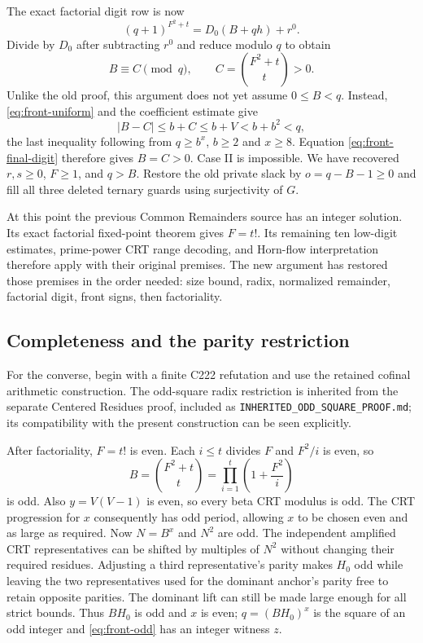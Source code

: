 The exact factorial digit row is now
\[
 (q+1)^{F^2+t}=D_0(B+qh)+r^0.
\]
Divide by $D_0$ after subtracting $r^0$ and reduce modulo $q$ to obtain
\begin{equation}
 B\equiv C\pmod q,
 \qquad C=\binom{F^2+t}{t}>0.
 \label{eq:front-final-digit}
\end{equation}
Unlike the old proof, this argument does not yet assume $0\leq B<q$.
Instead, \eqref{eq:front-uniform} and the coefficient estimate give
\[
 |B-C|\leq b+C\leq b+V<b+b^2<q,
\]
the last inequality following from $q\geq b^x$, $b\geq2$ and $x\geq8$.
Equation \eqref{eq:front-final-digit} therefore gives $B=C>0$.
Case II is impossible.  We have recovered $r,s\geq0$, $F\geq1$,
and $q>B$.  Restore the old private slack by $o=q-B-1\geq0$ and fill
all three deleted ternary guards using surjectivity of $G$.

At this point the previous Common Remainders source has an integer
solution.  Its exact factorial fixed-point theorem gives $F=t!$.
Its remaining ten low-digit estimates, prime-power CRT range decoding,
and Horn-flow interpretation therefore apply with their original
premises.  The new argument has restored those premises in the order
needed: size bound, radix, normalized remainder, factorial digit, front
signs, then factoriality.

\subsection{Completeness and the parity restriction}

For the converse, begin with a finite C222 refutation and use the
retained cofinal arithmetic construction.  The odd-square radix
restriction is inherited from the separate Centered Residues proof,
included as \texttt{INHERITED\_ODD\_SQUARE\_PROOF.md}; its compatibility
with the present construction can be seen explicitly.

After factoriality, $F=t!$ is even.  Each $i\leq t$ divides $F$ and
$F^2/i$ is even, so
\[
 B=\binom{F^2+t}{t}=\prod_{i=1}^t\left(1+\frac{F^2}{i}\right)
\]
is odd.  Also $y=V(V-1)$ is even, so every beta CRT modulus is odd.
The CRT progression for $x$ consequently has odd period, allowing $x$
to be chosen even and as large as required.  Now $N=B^x$ and $N^2$
are odd.  The independent amplified CRT representatives can be shifted
by multiples of $N^2$ without changing their required residues.
Adjusting a third representative's parity makes $H_0$ odd while leaving
the two representatives used for the dominant anchor's parity free to
retain opposite parities.  The dominant lift can still be made large
enough for all strict bounds.  Thus $BH_0$ is odd and $x$ is even;
$q=(BH_0)^x$ is the square of an odd integer and
\eqref{eq:front-odd} has an integer witness $z$.


